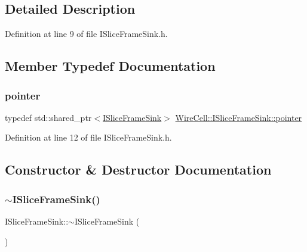 \subsection{Detailed Description}


Definition at line 9 of file I\+Slice\+Frame\+Sink.\+h.



\subsection{Member Typedef Documentation}
\mbox{\label{class_wire_cell_1_1_i_slice_frame_sink_a4cc331e8866097c1e1e0fbf98f925a0b}} 
\subsubsection{\texorpdfstring{pointer}{pointer}}
{\footnotesize\ttfamily typedef std\+::shared\+\_\+ptr$<$\hyperlink{class_wire_cell_1_1_i_slice_frame_sink}{I\+Slice\+Frame\+Sink}$>$ \hyperlink{class_wire_cell_1_1_i_slice_frame_sink_a4cc331e8866097c1e1e0fbf98f925a0b}{Wire\+Cell\+::\+I\+Slice\+Frame\+Sink\+::pointer}}



Definition at line 12 of file I\+Slice\+Frame\+Sink.\+h.



\subsection{Constructor \& Destructor Documentation}
\mbox{\label{class_wire_cell_1_1_i_slice_frame_sink_aa20950dee968a313fb413b70c3a94d4e}} 
\subsubsection{\texorpdfstring{$\sim$\+I\+Slice\+Frame\+Sink()}{~ISliceFrameSink()}}
{\footnotesize\ttfamily I\+Slice\+Frame\+Sink\+::$\sim$\+I\+Slice\+Frame\+Sink (\begin{DoxyParamCaption}{ }\end{DoxyParamCaption})\hspace{0.3cm}{\ttfamily [virtual]}}



